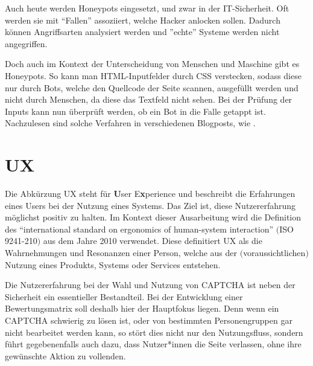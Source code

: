 Auch heute werden Honeypots eingesetzt, und zwar in der IT-Sicherheit. 
Oft werden sie mit ``Fallen'' assoziiert, welche Hacker anlocken sollen. 
Dadurch können Angriffsarten analysiert werden und ''echte'' Systeme werden nicht angegriffen.

Doch auch im Kontext der Unterscheidung von Menschen und Maschine gibt es Honeypots. 
So kann man HTML-Inputfelder durch CSS verstecken, sodass diese nur durch Bots, welche den Quellcode der Seite scannen, ausgefüllt werden 
und nicht durch Menschen, da diese das Textfeld nicht sehen. 
Bei der Prüfung der Inputs kann nun überprüft werden, ob ein Bot in die Falle getappt ist. 
Nachzulesen sind solche Verfahren in verschiedenen Blogposts, wie \cite{perry:2019}.


\section{UX}

Die Abkürzung UX steht für \textbf{U}ser E\textbf{x}perience und beschreibt die Erfahrungen eines Users bei der Nutzung eines Systems. 
Das Ziel ist, diese Nutzererfahrung möglichst positiv zu halten. 
Im Kontext dieser Ausarbeitung wird die Definition des  ``international standard on ergonomics of human-system interaction'' $($ISO 9241-210$)$
aus dem Jahre 2010 verwendet. 
Diese definitiert UX als die Wahrnehmungen und Resonanzen einer Person, 
welche aus der $($voraussichtlichen$)$ Nutzung eines Produkts, Systems oder Services entstehen. \cite[p.1629]{berni_borgianni_2021}

Die Nutzererfahrung bei der Wahl und Nutzung von CAPTCHA ist neben der Sicherheit ein essentieller Bestandteil.
Bei der Entwicklung einer Bewertungsmatrix soll deshalb hier der Hauptfokus liegen.
Denn wenn ein CAPTCHA schwierig zu lösen ist, oder von bestimmten Personengruppen gar nicht bearbeitet werden kann, so stört dies nicht nur den Nutzungsfluss,
sondern führt gegebenenfalls auch dazu, dass Nutzer*innen die Seite verlassen, ohne ihre gewünschte Aktion zu vollenden. 

